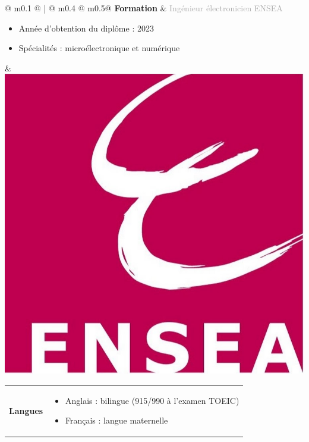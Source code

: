 \documentclass{article}
\begin{document}
\begin{tabular}{@{\hspace{0.05\textwidth}} m{0.1\textwidth} @ {\hspace{0.05\textwidth}} ! {\color{secondaryBlue}\vline width 2pt \hspace{0.04\textwidth}} @ {}m{0.4\textwidth} @{\hspace{0.15\textwidth}} m{0.5\linewidth}@{}}
    \textcolor{secondaryBlue}{\textbf{Formation}} & 
    \textcolor{darkGray}{Ingénieur électronicien ENSEA}
    \begin{itemize}[label={\textcolor{gray!80}{\checkmark}}, topsep=0pt, partopsep=0pt, itemsep=0.5pt, parsep=2pt, after=\vspace*{-\baselineskip}]
        \item \textcolor{gray!80}{Année d'obtention du diplôme : 2023} 
        \item \textcolor{gray!80}{Spécialités : microélectronique et numérique} 
    \end{itemize} &
    \includegraphics[width=0.1\linewidth]{ensea.jpg}
\end{tabular}



\begin{center}
\end{center}

\begin{tabular}{@{\hspace{0.05\textwidth}}m{}@{\hspace{0.05\textwidth}}!{\color{secondaryBlue}\vline width 2pt}@{}C{0.7\textwidth}@{}}
    \textcolor{secondaryBlue}{\textbf{Langues}} & 
    \begin{itemize}[label={}, topsep=0pt, partopsep=0pt, itemsep=0.5pt, parsep=2pt, after=\vspace*{-\baselineskip}]
        \item \textcolor{gray!80}{Anglais : bilingue (915/990 à l'examen TOEIC)}
        \item \textcolor{gray!80}{Français : langue maternelle}
    \end{itemize}
\end{tabular}
\end{document}
